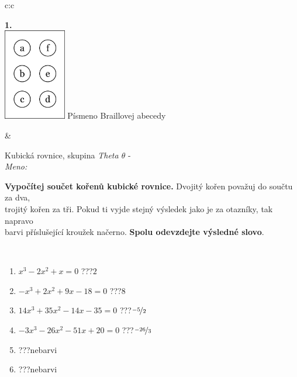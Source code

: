 \documentclass[10pt]{report}
\begin{document}
\begin{tabular}{c:c}
\begin{minipage}[c][104.5mm][t]{0.5\linewidth}
\begin{center}
\begin{minipage}{0.20\linewidth}
\begin{center}
{\Huge\bfseries 1.} \\[2mm]
\includegraphics[height=40mm]{../images/braille.png}
{\small Písmeno Braillovej abecedy}
\end{center}
\end{minipage}
\end{center}
\end{minipage}
&
\begin{minipage}[c][104.5mm][t]{0.5\linewidth}
\begin{center}
\vspace{7mm}
{\huge Kubická rovnice, skupina \textit{Theta $\theta$} -}\\[5mm]
\textit{Meno:}\phantom{xxxxxxxxxxxxxxxxxxxxxxxxxxxxxxxxxxxxxxxxxxxxxxxxxxxxxxxxxxxxxxxxx}\\[5mm]
\begin{minipage}{0.95\linewidth}
\textbf{Vypočítej součet kořenů kubické rovnice.} Dvojitý kořen považuj do součtu za dva,\\trojitý kořen za tři. Pokud ti vyjde stejný výsledek jako je za otazníky, tak napravo\\barvi příslušející kroužek načerno. \textbf{Spolu odevzdejte výsledné slovo}.
\end{minipage}
\\[1mm]
\begin{minipage}{0.79\linewidth}
\begin{center}
\begin{varwidth}{\linewidth}
\begin{enumerate}
\Large
\item $x^3-2x^2+x=0$\quad \dotfill\; ???\;\dotfill \quad $2$
\item $-x^3+2x^2+9x-18=0$\quad \dotfill\; ???\;\dotfill \quad $8$
\item $14x^3+35x^2-14x-35=0$\quad \dotfill\; ???\;\dotfill \quad $\nicefrac{-5}{2}$
\item $-3x^3-26x^2-51x+20=0$\quad \dotfill\; ???\;\dotfill \quad $\nicefrac{-26}{3}$
\item \quad \dotfill\; ???\;\dotfill \quad nebarvi
\item \quad \dotfill\; ???\;\dotfill \quad nebarvi

\end{enumerate}
\end{varwidth}
\end{center}
\end{minipage}
\end{center}
\end{minipage}
\end{tabular}
\end{document}
